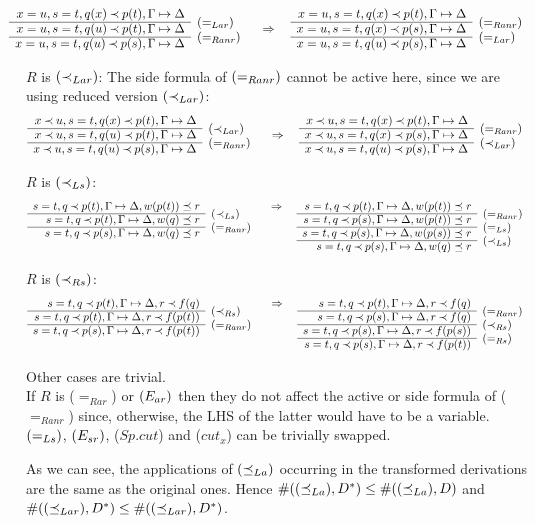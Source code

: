\begin{PROOF}
\begin{LS}
\[ \hspace*{-1.5em}  \begin{array}{rl} 
x=u, s=t, q(x)\Incl p(t), \GSD \\ \cline{1-1}
x=u, s=t, q(u)\Incl p(t), \GSD & \rabove{\eLar} \cl
x=u, s=t, q(u)\Incl p(s), \GSD & \rabove{\eRanr} \end{array} \conv
\begin{array}{rl}
x=u, s=t, q(x)\Incl p(t), \GSD \\ \cline{1-1}
x=u, s=t, q(x)\Incl p(s), \GSD & \rabove{\eRanr} \cl
x=u, s=t, q(u)\Incl p(s), \GSD & \rabove{\eLar} \end{array} \]
%
\item $R$ is $(\mathbin{\prec}_{Lar})$: The side formula of $(=_{Ranr})$ cannot be active
here, since we are using reduced version $(\mathbin{\prec}_{Lar})$:
\[ \begin{array}{rl}
x\Incl u, s=t, q(x)\Incl p(t), \GSD \\ \cline{1-1}
x\Incl u, s=t, q(u)\Incl p(t), \GSD & \rabove{\iLar} \cl
x\Incl u, s=t, q(u)\Incl p(s), \GSD & \rabove{\eRanr} \end{array} 
\conv
\begin{array}{rl}
x\Incl u, s=t, q(x)\Incl p(t), \GSD \\ \cline{1-1}
x\Incl u, s=t, q(x)\Incl p(s), \GSD & \rabove{\eRanr} \cl
x\Incl u, s=t, q(u)\Incl p(s), \GSD & \rabove{\iLar} \end{array} \]
%
\item $R$ is $(\mathbin{\prec}_{Ls})$: %
\[ \prar{
s=t, q\Incl p(t), \GSD, w(p(t))\preceq r \cl
s=t, q\Incl p(t), \GSD, w(q)\preceq r & \rabove{\iLs} \cl
s=t, q\Incl p(s), \GSD, w(q)\preceq r & \rabove{\eRanr} 
}
\conv
\prar{
s=t, q\Incl p(t), \GSD, w(p(t))\preceq r \cl
s=t, q\Incl p(s), \GSD, w(p(t))\preceq r & \rabove{\eRanr} \cl
s=t, q\Incl p(s), \GSD, w(p(s))\preceq r & \rabove{\eLs} \cl
s=t, q\Incl p(s), \GSD, w(q)\preceq r & \rabove{\iLs} 
} \]
%
\item $R$ is $(\mathbin{\prec}_{Rs})$:
\[ \prar{
s=t, q\Incl p(t),\GSD, r\Incl f(q) \cl
s=t, q\Incl p(t),\GSD, r\Incl f(p(t)) & \rabove{\iRs} \cl
s=t, q\Incl p(s),\GSD, r\Incl f(p(t)) & \rabove{\eRanr}
} \conv
\prar{
s=t, q\Incl p(t),\GSD, r\Incl f(q) \cl
s=t, q\Incl p(s),\GSD, r\Incl f(q) & \rabove{\eRanr}\cl
s=t, q\Incl p(s),\GSD, r\Incl f(p(s)) & \rabove{\iRs} \cl
s=t, q\Incl p(s),\GSD, r\Incl f(p(t)) & \rabove{\eRs} %
}
\]
\item Other cases are trivial. \\
If $R$ is ($=_{Rar}$) or $(E_{ar})$ then they do not affect the active or side
formula of ($=_{Ranr}$) since, otherwise, the LHS of the latter would have to
be a variable. \\
$(=_{Ls})$, $(E_{sr})$, ($Sp.cut$) and ($cut_x$) can be trivially swapped.
\end{LS}
As we can see, the applications of $(\preceq_{La})$ 
occurring in the transformed derivations are the same as the original ones. 
Hence $\#((\preceq_{La}),D^*)\leq\#((\preceq_{La}),D)$ and $\#((\preceq_{Lar}),D^*)\leq
\#((\preceq_{Lar}),D^*)$.
\end{PROOF}
